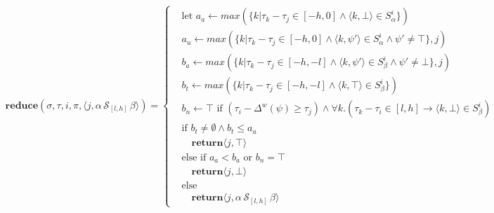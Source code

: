\documentclass[10pt,a4paper]{article}
\newcommand{\rp}[2]{\ensuremath{\langle #1, #2 \rangle}}
\begin{document}
\begin{align*}
\mathbf{reduce}(\sigma,\tau, i,\pi,\rp{j}{\alpha\, \mathcal{S}_{[l,h]}\, \beta}) = \left\{
\begin{aligned}
&\text{let } a_a \leftarrow max(\{k | \tau_k - \tau_j \in [-h, 0] \wedge \rp{k}{\bot} \in S^i_{\alpha} \})  \\
&a_u \leftarrow max(\{k | \tau_k - \tau_j \in [-h, 0] \wedge  \rp{k}{\psi'} \in S^i_{\alpha} \wedge \psi' \neq \top \}, j) \\
&b_a \leftarrow max(\{k | \tau_k - \tau_j \in [-h, -l] \wedge \rp{k}{\psi'} \in S^i_{\beta} \wedge \psi' \neq \bot \}, j)  \\
&b_t \leftarrow max(\{k | \tau_k - \tau_j \in [-h, -l] \wedge \rp{k}{\top} \in S^i_{\beta} \}) \\
&b_n \leftarrow \top \text{ if } (\tau_i - \Delta^w(\psi) \geq \tau_j) \wedge \forall k.(\tau_k - \tau_i \in [l,h] \rightarrow \rp{k}{\bot} \in S^i_{\beta}) \\
&\text{if }b_t \neq \emptyset \wedge b_t \leq a_u \\
& \quad\mathbf{return} \rp{j}{\top} \\
&\text{else if } a_a < b_a \text{ or } b_n = \top\\ & \quad\mathbf{return} \rp{j}{\bot} \\
&\text{else} \\
& \quad\mathbf{return} \rp{j}{\alpha\, \mathcal{S}_{[l,h]}\, \beta}
\end{aligned} \right. \\
\end{align*}
\end{document}
